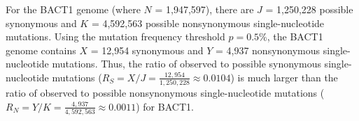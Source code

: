 For the BACT1 genome
(where $N$ = 1,947,597),
there are $J$ = 1,250,228 possible synonymous and
$K$ = 4,592,563 possible nonsynonymous single-nucleotide mutations.
%
Using the mutation frequency threshold $p = 0.5\%$,
the BACT1 genome contains
$X$ = 12,954 synonymous and
$Y$ = 4,937 nonsynonymous single-nucleotide mutations.
%
Thus, the ratio of observed to possible synonymous single-nucleotide mutations
($R_S = X / J = \frac{12,954}{1,250,228}
\approx 0.0104$)
is much larger than the ratio of observed to possible nonsynonymous single-nucleotide mutations
($R_N = Y / K = \frac{4,937}{4,592,563}
\approx 0.0011$)
for BACT1.
\endinput